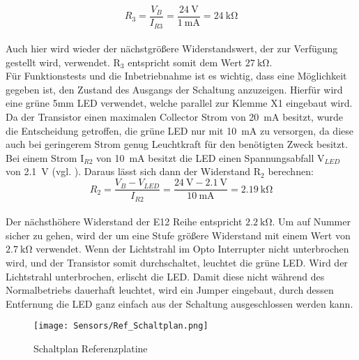 \begin{equation*}
    R_{3} = \frac{V_{B}}{I_{R3}} = \frac{\qty{24}{\volt}}{\qty{1}{\milli\ampere}} = \qty{24}{\kilo\ohm}
\end{equation*}\\

Auch hier wird wieder der nächstgrößere Widerstandswert, der zur Verfügung gestellt wird, verwendet. R$_{3}$ entspricht somit dem Wert $\qty{27}{\kilo\ohm}$.\\
Für Funktionstests und die Inbetriebnahme ist es wichtig, dass eine Möglichkeit gegeben ist, den Zustand des Ausgangs der Schaltung anzuzeigen. Hierfür wird eine grüne 5mm LED verwendet, welche parallel zur Klemme X1 eingebaut wird. Da der Transistor einen maximalen Collector Strom von \qty{20}{\milli\ampere} besitzt, wurde die Entscheidung getroffen, die grüne LED nur mit \qty{10}{\milli\ampere} zu versorgen, da diese auch bei geringerem Strom genug Leuchtkraft für den benötigten Zweck besitzt. Bei einem Strom I$_{R2}$ von \qty{10}{\milli\ampere} besitzt die LED einen Spannungsabfall V$_{LED}$ von \qty{2.1}{\volt} (vgl. \cite{led_grün}). Daraus lässt sich dann der Widerstand R$_{2}$ berechnen:\\

\begin{equation*}
    R_{2} = \frac{V_{B} - V_{LED}}{I_{R2}} = \frac{\qty{24}{\volt} - \qty{2.1}{\volt}}{\qty{10}{\milli\ampere}} = \qty{2.19}{\kilo\ohm}
\end{equation*}\\

Der nächsthöhere Widerstand der E12 Reihe entspricht $\qty{2,2}{\kilo\ohm}$. Um auf Nummer sicher zu gehen, wird der um eine Stufe größere Widerstand mit einem Wert von $\qty{2,7}{\kilo\ohm}$ verwendet. Wenn der Lichtstrahl im Opto Interrupter nicht unterbrochen wird, und der Transistor somit durchschaltet, leuchtet die grüne LED. Wird der Lichtstrahl unterbrochen, erlischt die LED. Damit diese nicht während des Normalbetriebs dauerhaft leuchtet, wird ein Jumper eingebaut, durch dessen Entfernung die LED ganz einfach aus der Schaltung ausgeschlossen werden kann.

\begin{figure}[H]
    \centering
    \texttt{[image: Sensors/Ref\_Schaltplan.png]}
    \caption{Schaltplan Referenzplatine}
    \label{Ref_Schaltplan}
\end{figure}

